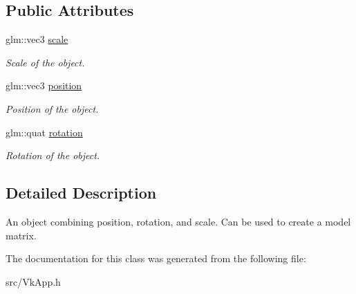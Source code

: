 \subsection*{Public Attributes}
\begin{DoxyCompactItemize}
\item 
\mbox{\label{class_transform_acf6ab53778448fd2f2d8a367c14e7f95}} 
glm\+::vec3 \mbox{\hyperlink{class_transform_acf6ab53778448fd2f2d8a367c14e7f95}{scale}}
\begin{DoxyCompactList}\small\item\em Scale of the object. \end{DoxyCompactList}\item 
\mbox{\label{class_transform_aa357f8eb780f4ef195027d1c636baa36}} 
glm\+::vec3 \mbox{\hyperlink{class_transform_aa357f8eb780f4ef195027d1c636baa36}{position}}
\begin{DoxyCompactList}\small\item\em Position of the object. \end{DoxyCompactList}\item 
\mbox{\label{class_transform_a04e5b17a17093c5eb72e70e392addaec}} 
glm\+::quat \mbox{\hyperlink{class_transform_a04e5b17a17093c5eb72e70e392addaec}{rotation}}
\begin{DoxyCompactList}\small\item\em Rotation of the object. \end{DoxyCompactList}\end{DoxyCompactItemize}


\subsection{Detailed Description}
An object combining position, rotation, and scale. Can be used to create a model matrix. 

The documentation for this class was generated from the following file\+:\begin{DoxyCompactItemize}
\item 
src/Vk\+App.\+h\end{DoxyCompactItemize}
